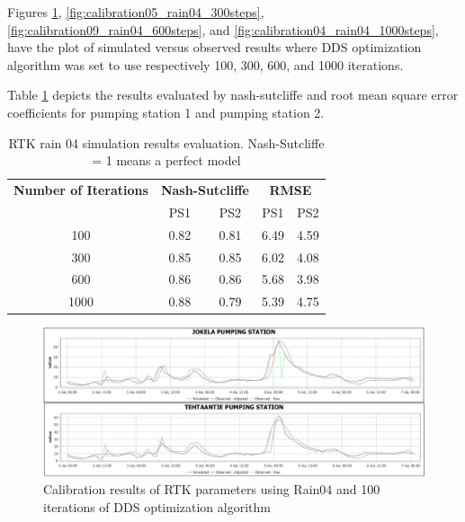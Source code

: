 Figures \ref{fig:calibration06_rain04_100steps}, \ref{fig:calibration05_rain04_300steps}, \ref{fig:calibration09_rain04_600steps}, and \ref{fig:calibration04_rain04_1000steps}, have the plot of simulated versus observed results where DDS optimization algorithm was set to use respectively 100, 300, 600, and 1000 iterations. 

Table \ref{tbl:rtkresults} depicts the results evaluated by nash-sutcliffe and root mean square error coefficients for pumping station 1 and pumping station 2.

\begin{table}[h]
\caption{RTK rain 04 simulation results evaluation. Nash-Sutcliffe = 1 means a perfect model}
\label{tbl:rtkresults}
\centering
\begin{tabular}{ccccc}
\toprule
\textbf{Number of Iterations} & \multicolumn{2}{c}{\textbf{Nash-Sutcliffe}} & \multicolumn{2}{c}{\textbf{RMSE}} \\ \cline{2-5} 
                              & PS1                  & PS2                  & PS1             & PS2             \\ \cline{2-5} 
100                           & 0.82                 & 0.81                 & 6.49            & 4.59            \\
300                           & 0.85                 & 0.85                 & 6.02            & 4.08            \\
600                           & 0.86                 & 0.86                 & 5.68            & 3.98            \\
1000                          & 0.88                 & 0.79                 & 5.39            & 4.75     
\\ \bottomrule
\end{tabular}
\end{table}


\begin{figure}[h]
    \centering
	\includegraphics[scale=0.45]{figures/calibration06_rain04_100steps.JPG}
	\caption{Calibration results of RTK parameters using Rain04 and 100 iterations of DDS optimization algorithm}
	\label{fig:calibration06_rain04_100steps}
\end{figure}

